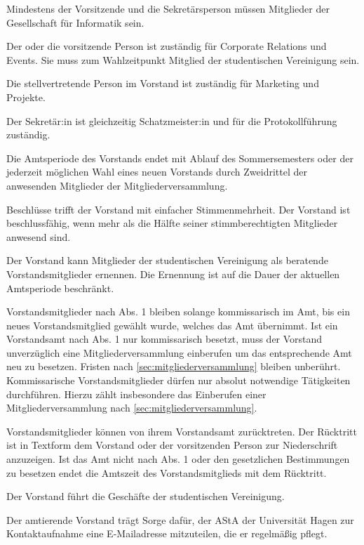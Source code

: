 \begin{contract}
Mindestens der Vorsitzende und die Sekretärsperson müssen Mitglieder der Gesellschaft für Informatik sein.

Der oder die vorsitzende Person ist zuständig für Corporate Relations und Events. Sie muss zum Wahlzeitpunkt Mitglied der studentischen Vereinigung sein.

Die stellvertretende Person im Vorstand ist zuständig für Marketing und Projekte.

Der Sekretär:in ist gleichzeitig Schatzmeister:in und für die Protokollführung zuständig.

Die Amtsperiode des Vorstands endet mit Ablauf des Sommersemesters oder der jederzeit möglichen Wahl eines neuen Vorstands durch Zweidrittel der anwesenden Mitglieder der Mitgliederversammlung. \label{sec:vorstand-VorzeitigeAbwahl}

Beschlüsse trifft der Vorstand mit einfacher Stimmenmehrheit. Der Vorstand ist beschlussfähig, wenn mehr als die Hälfte seiner stimmberechtigten Mitglieder anwesend sind.

Der Vorstand kann Mitglieder der studentischen Vereinigung als beratende Vorstandsmitglieder ernennen. Die Ernennung ist auf die Dauer der aktuellen Amtsperiode beschränkt.

Vorstandsmitglieder nach Abs. 1 bleiben solange kommissarisch im Amt, bis ein neues Vorstandsmitglied gewählt wurde, welches das Amt übernimmt. Ist ein Vorstandsamt nach Abs. 1 nur kommissarisch besetzt, muss der Vorstand unverzüglich eine Mitgliederversammlung einberufen um das entsprechende Amt neu zu besetzen. Fristen nach \ref{sec:mitgliederversammlung} bleiben unberührt. Kommissarische Vorstandsmitglieder dürfen nur absolut notwendige Tätigkeiten durchführen. Hierzu zählt insbesondere das Einberufen einer Mitgliederversammlung nach \ref{sec:mitgliederversammlung}.

Vorstandsmitglieder können von ihrem Vorstandsamt zurücktreten. Der Rücktritt ist in Textform dem Vorstand oder der vorsitzenden Person zur Niederschrift anzuzeigen. Ist das Amt nicht nach Abs. 1 oder den gesetzlichen Bestimmungen zu besetzen endet die Amtszeit des Vorstandsmitglieds mit dem Rücktritt.

\label{sec:geschäftsbereichVorstand}

Der Vorstand führt die Geschäfte der studentischen Vereinigung.

Der amtierende Vorstand trägt Sorge dafür, der AStA der Universität Hagen zur Kontaktaufnahme eine E-Mailadresse mitzuteilen, die er regelmäßig pflegt.



\end{contract}
